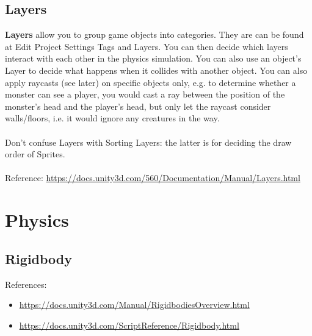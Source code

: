 \documentclass[a4paper,11pt]{article}
\begin{document}
\subsection{Layers}
\textbf{Layers} allow you to group game objects into categories.
They are can be found at Edit {\rightarrow} Project Settings {\rightarrow} Tags and Layers.
You can then decide which layers interact with each other in the physics simulation.
You can also use an object's Layer to decide what happens when it collides with another object.
You can also apply raycasts (see later) on specific objects only, e.g. to determine whether a monster can see a player, 
you would cast a ray between the position of the monster's head and the player's head, but only let the raycast consider
walls/floors, i.e. it would ignore any creatures in the way.
\\\\ 
Don't confuse Layers with Sorting Layers: the latter is for deciding the draw order of Sprites.
\\\\
Reference: \url{https://docs.unity3d.com/560/Documentation/Manual/Layers.html}

\section{Physics}
\subsection{Rigidbody}
References:
\begin{itemize}
    \item   \url{https://docs.unity3d.com/Manual/RigidbodiesOverview.html}
    \item   \url{https://docs.unity3d.com/ScriptReference/Rigidbody.html}
\end{itemize}
\end{document}
